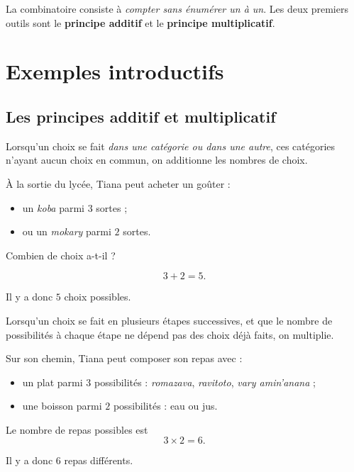 \documentclass[11pt]{article}
\begin{document}

La combinatoire consiste à \emph{compter sans énumérer un à un}.
Les deux premiers outils sont le \textbf{principe additif} et le
\textbf{principe multiplicatif}.

\section{Exemples introductifs}\label{sec:exemples-introductifs}

\subsection{Les principes additif et multiplicatif}\label{sec:principes-additif-multiplicatif}

\begin{theoreme}\label{thm:additif}
Lorsqu’un choix se fait \emph{dans une catégorie ou dans une autre}, ces catégories n’ayant
aucun choix en commun, on additionne les nombres de choix.
\end{theoreme}

\begin{exemple}
À la sortie du lycée, Tiana peut acheter un goûter :
\begin{itemize}
    \item un \emph{koba} parmi \(3\) sortes ;
    \item ou un \emph{mokary} parmi \(2\) sortes.
\end{itemize}
Combien de choix a-t-il ?
\end{exemple}

\begin{solution}
\[
3+2=5.
\]

Il y a donc \(\boxed{5}\) choix possibles.
\end{solution}

\begin{theoreme}\label{thm:multiplicatif}
Lorsqu’un choix se fait en plusieurs étapes successives, et que le nombre de possibilités
à chaque étape ne dépend pas des choix déjà faits, on multiplie.
\end{theoreme}

\begin{exemple}
Sur son chemin, Tiana peut composer son repas avec :
\begin{itemize}
    \item un plat parmi \(3\) possibilités : \emph{romazava}, \emph{ravitoto}, \emph{vary amin’anana} ;
    \item une boisson parmi \(2\) possibilités : eau ou jus.
\end{itemize}
Le nombre de repas possibles est
\[
3\times 2=6.
\]

Il y a donc \(\boxed{6}\) repas différents.
\end{exemple}
\end{document}
